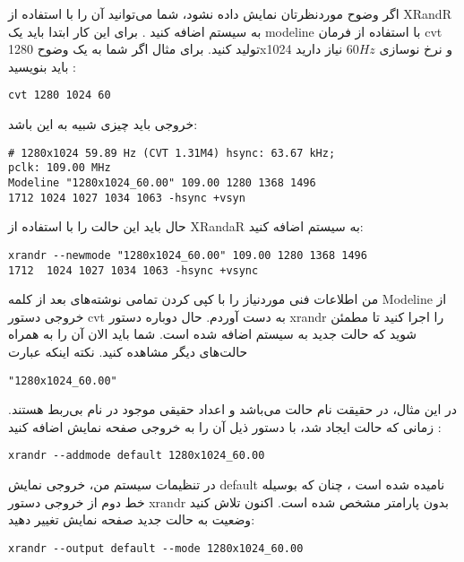 \documentclass[a4paper,12pt]{article}
\begin{document}
اگر وضوح موردنظرتان نمایش داده نشود، شما می‌توانید آن را با استفاده از XRandR به سیستم اضافه کنید . برای این کار ابتدا باید یک modeline با استفاده از فرمان  cvt تولید کنید. برای مثال اگر شما به یک وضوح 1280x1024 و نرخ نوسازی $60Hz$  نیاز دارید باید بنویسید :
\begin{LTR}
\begin{Verbatim}[frame=single,formatcom=\color{magenta}]
cvt 1280 1024 60
\end{Verbatim}
\end{LTR}
خروجی باید چیزی شبیه به این باشد: 
\begin{LTR}
\begin{Verbatim}[frame=single,formatcom=\color{cyan}]
# 1280x1024 59.89 Hz (CVT 1.31M4) hsync: 63.67 kHz; 
pclk: 109.00 MHz
Modeline "1280x1024_60.00" 109.00 1280 1368 1496 
1712 1024 1027 1034 1063 -hsync +vsyn
\end{Verbatim}
\end{LTR}
حال باید این حالت را با استفاده از  XRandaR به سیستم اضافه کنید:
\begin{LTR}
\begin{Verbatim}[frame=single,formatcom=\color{magenta}]
xrandr --newmode "1280x1024_60.00" 109.00 1280 1368 1496 
1712  1024 1027 1034 1063 -hsync +vsync
\end{Verbatim}
\end{LTR}
من اطلاعات فنی موردنیاز را با کپی کردن تمامی نوشته‌های  بعد از کلمه Modeline از خروجی دستور cvt به دست آوردم. حال دوباره دستور xrandr را اجرا کنید تا مطمئن شوید که حالت جدید به سیستم اضافه شده است. شما باید الان  آن را به همراه حالت‌های دیگر مشاهده کنید. نکته اینکه عبارت 
\begin{BVerbatim}
"1280x1024_60.00"
\end{BVerbatim}
 در این مثال، در حقیقت نام حالت  می‌باشد و اعداد حقیقی موجود در نام بی‌ربط هستند. زمانی که حالت ایجاد شد، با دستور ذیل آن را به خروجی صفحه نمایش اضافه کنید :
\begin{LTR}
\begin{Verbatim}[frame=single,formatcom=\color{magenta}]
xrandr --addmode default 1280x1024_60.00
\end{Verbatim}
\end{LTR}
در تنظیمات سیستم من، خروجی نمایش default نامیده شده است ، چنان که بوسیله خط دوم از خروجی دستور xrandr بدون پارامتر مشخص شده است. اکنون تلاش کنید وضعیت به حالت جدید صفحه نمایش تغییر دهید:
\begin{LTR}
\begin{Verbatim}[frame=single,formatcom=\color{magenta}]
xrandr --output default --mode 1280x1024_60.00
\end{Verbatim}
\end{LTR}
\end{document}
